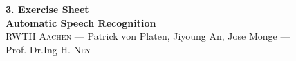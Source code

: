 \documentclass[12pt,oneside,a4paper]{article}
\begin{document}
\begin{center}
{\LARGE \bfseries 
 3. Exercise Sheet  \\[0.1cm] 
}
{ \large \bfseries
 Automatic Speech Recognition \\[0.3cm] %
}
{\large
  \textsc{RWTH Aachen} --- Patrick von Platen, Jiyoung An, Jose Monge ---\\[0.3cm]
}
{\normalsize
  Prof. Dr.Ing H. \textsc{Ney} \\[0.92cm] %
}
\end{center}
  
 \newpage
 


\end{document}

